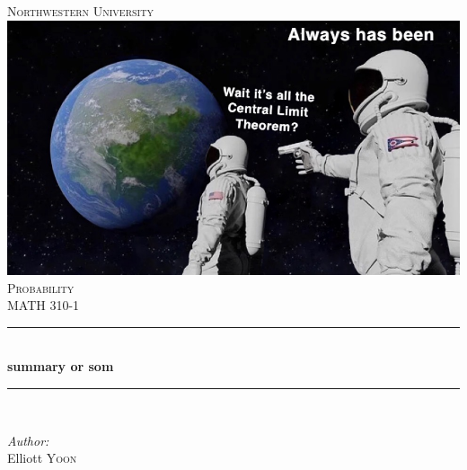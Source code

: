 \documentclass{article}
\begin{document}
\begin{titlepage}

\newcommand{\HRule}{\rule{\linewidth}{0.5mm}}

\center %
 

\textsc{\LARGE Northwestern University}\\[1.5cm] %
\includegraphics[scale=0.4]{IMG_0148.JPG}\\[2cm] %
\textsc{\Large Probability}\\[0.5cm] %
\textsc{\large MATH 310-1}\\[0.5cm] %


\HRule \\[0.4cm]
{ \huge \bfseries summary or som}\\[0.4cm] %
\HRule \\[1.5cm]
 

\begin{minipage}{0.4\textwidth}
\begin{flushleft} \large
\emph{Author:}\\
Elliott \textsc{Yoon}\\ %
\end{flushleft}


\end{minipage}
\end{titlepage}
\end{document}
